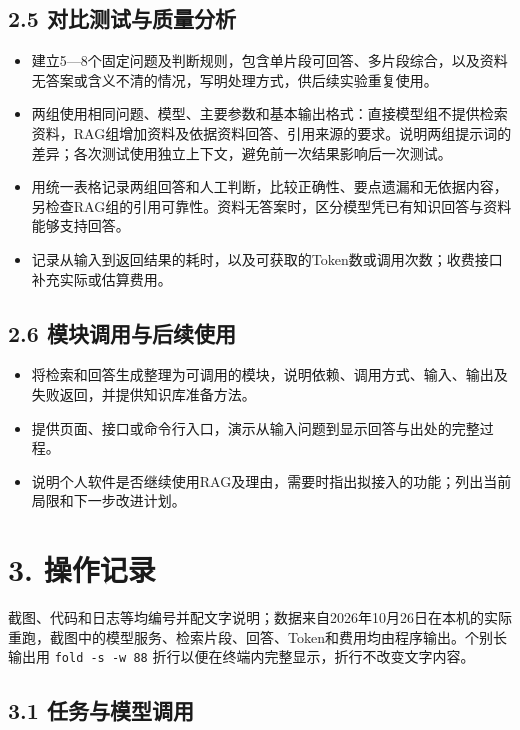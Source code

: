 \documentclass[UTF8,12pt,a4paper]{ctexart}
\begin{document}
\subsection*{2.5 对比测试与质量分析}

\begin{itemize}
  \item 建立5—8个固定问题及判断规则，包含单片段可回答、多片段综合，以及资料无答案或含义不清的情况，写明处理方式，供后续实验重复使用。
  \item 两组使用相同问题、模型、主要参数和基本输出格式：直接模型组不提供检索资料，RAG组增加资料及依据资料回答、引用来源的要求。说明两组提示词的差异；各次测试使用独立上下文，避免前一次结果影响后一次测试。
  \item 用统一表格记录两组回答和人工判断，比较正确性、要点遗漏和无依据内容，另检查RAG组的引用可靠性。资料无答案时，区分模型凭已有知识回答与资料能够支持回答。
  \item 记录从输入到返回结果的耗时，以及可获取的Token数或调用次数；收费接口补充实际或估算费用。
\end{itemize}

\subsection*{2.6 模块调用与后续使用}

\begin{itemize}
  \item 将检索和回答生成整理为可调用的模块，说明依赖、调用方式、输入、输出及失败返回，并提供知识库准备方法。
  \item 提供页面、接口或命令行入口，演示从输入问题到显示回答与出处的完整过程。
  \item 说明个人软件是否继续使用RAG及理由，需要时指出拟接入的功能；列出当前局限和下一步改进计划。
\end{itemize}

\section*{3. 操作记录}

截图、代码和日志等均编号并配文字说明；数据来自2026年10月26日在本机的实际重跑，截图中的模型服务、检索片段、回答、Token和费用均由程序输出。个别长输出用 \texttt{fold -s -w 88} 折行以便在终端内完整显示，折行不改变文字内容。

\subsection*{3.1 任务与模型调用}
\end{document}
